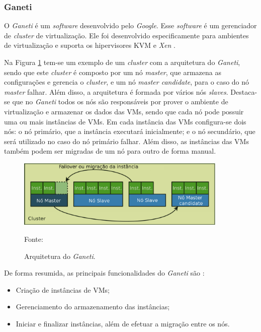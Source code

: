 \subsubsection{Ganeti}
\label{section:ganeti}
O \textit{Ganeti} \cite{ganeti} é um \textit{software} desenvolvido pelo \textit{Google}. Esse \textit{software} é um gerenciador de 
\textit{cluster} de virtualização. Ele foi desenvolvido especificamente para ambientes de virtualização e suporta os hipervisores 
\ac{KVM} \cite{kvm} e \textit{Xen} \cite{xen}. 

Na Figura \ref{fig:ganeti_arquitetura} tem-se um exemplo de um \textit{cluster} com a arquitetura do \textit{Ganeti}, sendo que este 
\textit{cluster} é composto por um nó \textit{master}, que armazena as configurações e gerencia o \textit{cluster}, e um nó 
\textit{master candidate}, para o caso do nó \textit{master} falhar. Além disso, a arquitetura é formada por vários nós \textit{slaves}. 
Destaca-se que no \textit{Ganeti} todos os nós são responsáveis por prover o ambiente de virtualização e armazenar os dados das \acp{VM}, 
sendo que cada nó pode possuir uma ou mais instâncias de \acp{VM}. Em cada instância das \acp{VM} configura-se dois nós: o nó primário, que a 
instância executará inicialmente; e o nó secundário, que será utilizado no caso do nó primário falhar.
Além disso, as instâncias das \acp{VM} também podem ser migradas de um nó para outro de forma manual. 

\begin{figure}[h!]
 \centering
 \includegraphics[width=380px]{img/ganeti_arquitetura.eps}
 \caption{Arquitetura do \textit{Ganeti}.}
 Fonte: \citet{carvalho2011}
 \label{fig:ganeti_arquitetura}
\end{figure}

De forma resumida, as principais funcionalidades do \textit{Ganeti} são \cite{ganeti}:
\begin{itemize}
 \item Criação de instâncias de \acp{VM};
 \item Gerenciamento do armazenamento das instâncias;
 \item Iniciar e finalizar instâncias, além de efetuar a migração entre os nós.
\end{itemize}

